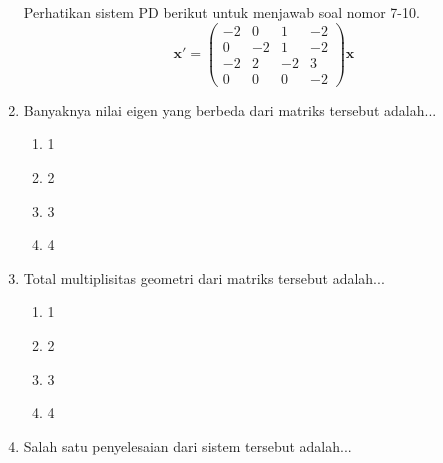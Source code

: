 \documentclass[a4paper]{article}
\theoremstyle{definisi}
\numberwithin{equation}{section}
\begin{document}
\begin{enumerate}
    Perhatikan sistem PD berikut untuk menjawab soal nomor 7-10.
    \begin{equation*}
      \mathbf{x'}=\begin{pmatrix}
        -2&0&1&-2\\
        0&-2&1&-2\\
        -2&2&-2&3\\
        0&0&0&-2
      \end{pmatrix}\mathbf{x}
    \end{equation*}
    \item Banyaknya nilai eigen yang berbeda dari matriks tersebut adalah...
    \begin{enumerate}
      \item 1
      \item 2
      \item 3
      \item 4
    \end{enumerate}
    \item Total multiplisitas geometri dari matriks tersebut adalah...
    \begin{enumerate}
      \item 1
      \item 2
      \item 3
      \item 4
    \end{enumerate}
    \item Salah satu penyelesaian dari sistem tersebut adalah...
\end{enumerate}
\end{document}
